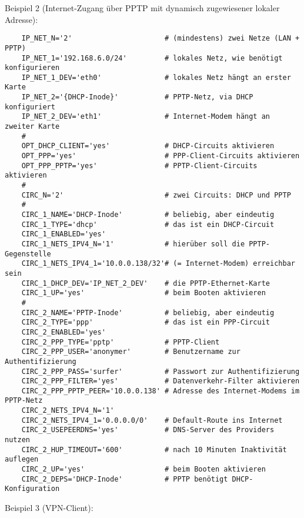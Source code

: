 \noindent
Beispiel 2 (Internet-Zugang über PPTP mit dynamisch zugewiesener lokaler
Adresse):

\begin{example}
\begin{verbatim}
    IP_NET_N='2'                      # (mindestens) zwei Netze (LAN + PPTP)
    IP_NET_1='192.168.6.0/24'         # lokales Netz, wie benötigt konfigurieren
    IP_NET_1_DEV='eth0'               # lokales Netz hängt an erster Karte
    IP_NET_2='{DHCP-Inode}'           # PPTP-Netz, via DHCP konfiguriert
    IP_NET_2_DEV='eth1'               # Internet-Modem hängt an zweiter Karte
    #
    OPT_DHCP_CLIENT='yes'             # DHCP-Circuits aktivieren
    OPT_PPP='yes'                     # PPP-Client-Circuits aktivieren
    OPT_PPP_PPTP='yes'                # PPTP-Client-Circuits aktivieren
    #
    CIRC_N='2'                        # zwei Circuits: DHCP und PPTP
    #
    CIRC_1_NAME='DHCP-Inode'          # beliebig, aber eindeutig
    CIRC_1_TYPE='dhcp'                # das ist ein DHCP-Circuit
    CIRC_1_ENABLED='yes'
    CIRC_1_NETS_IPV4_N='1'            # hierüber soll die PPTP-Gegenstelle
    CIRC_1_NETS_IPV4_1='10.0.0.138/32'# (= Internet-Modem) erreichbar sein
    CIRC_1_DHCP_DEV='IP_NET_2_DEV'    # die PPTP-Ethernet-Karte
    CIRC_1_UP='yes'                   # beim Booten aktivieren
    #
    CIRC_2_NAME='PPTP-Inode'          # beliebig, aber eindeutig
    CIRC_2_TYPE='ppp'                 # das ist ein PPP-Circuit
    CIRC_2_ENABLED='yes'
    CIRC_2_PPP_TYPE='pptp'            # PPTP-Client
    CIRC_2_PPP_USER='anonymer'        # Benutzername zur Authentifizierung
    CIRC_2_PPP_PASS='surfer'          # Passwort zur Authentifizierung
    CIRC_2_PPP_FILTER='yes'           # Datenverkehr-Filter aktivieren
    CIRC_2_PPP_PPTP_PEER='10.0.0.138' # Adresse des Internet-Modems im PPTP-Netz
    CIRC_2_NETS_IPV4_N='1'
    CIRC_2_NETS_IPV4_1='0.0.0.0/0'    # Default-Route ins Internet
    CIRC_2_USEPEERDNS='yes'           # DNS-Server des Providers nutzen
    CIRC_2_HUP_TIMEOUT='600'          # nach 10 Minuten Inaktivität auflegen
    CIRC_2_UP='yes'                   # beim Booten aktivieren
    CIRC_2_DEPS='DHCP-Inode'          # PPTP benötigt DHCP-Konfiguration
\end{verbatim}
\end{example}

\noindent
Beispiel 3 (VPN-Client):

